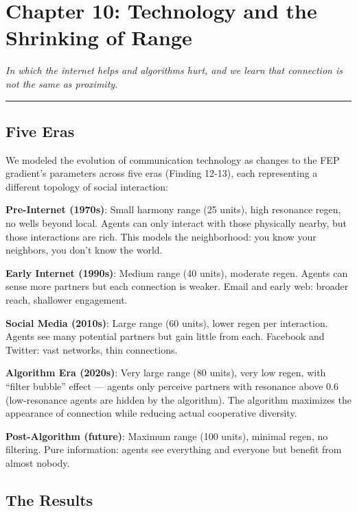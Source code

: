 \chapter{Chapter 10: Technology and the Shrinking of Range}\label{chapter-10-technology-and-the-shrinking-of-range}

\emph{In which the internet helps and algorithms hurt, and we learn that connection is not the same as proximity.}

\begin{center}\rule{0.5\linewidth}{0.5pt}\end{center}

\section{Five Eras}\label{five-eras}

We modeled the evolution of communication technology as changes to the FEP gradient's parameters across five eras (Finding 12-13), each representing a different topology of social interaction:

\textbf{Pre-Internet (1970s)}: Small harmony range (25 units), high resonance regen, no wells beyond local. Agents can only interact with those physically nearby, but those interactions are rich. This models the neighborhood: you know your neighbors, you don't know the world.

\textbf{Early Internet (1990s)}: Medium range (40 units), moderate regen. Agents can sense more partners but each connection is weaker. Email and early web: broader reach, shallower engagement.

\textbf{Social Media (2010s)}: Large range (60 units), lower regen per interaction. Agents see many potential partners but gain little from each. Facebook and Twitter: vast networks, thin connections.

\textbf{Algorithm Era (2020s)}: Very large range (80 units), very low regen, with ``filter bubble'' effect --- agents only perceive partners with resonance above 0.6 (low-resonance agents are hidden by the algorithm). The algorithm maximizes the appearance of connection while reducing actual cooperative diversity.

\textbf{Post-Algorithm (future)}: Maximum range (100 units), minimal regen, no filtering. Pure information: agents see everything and everyone but benefit from almost nobody.

\section{The Results}\label{the-results}

